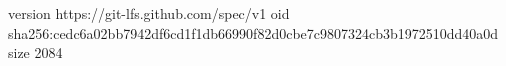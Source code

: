version https://git-lfs.github.com/spec/v1
oid sha256:cedc6a02bb7942df6cd1f1db66990f82d0cbe7c9807324cb3b1972510dd40a0d
size 2084
